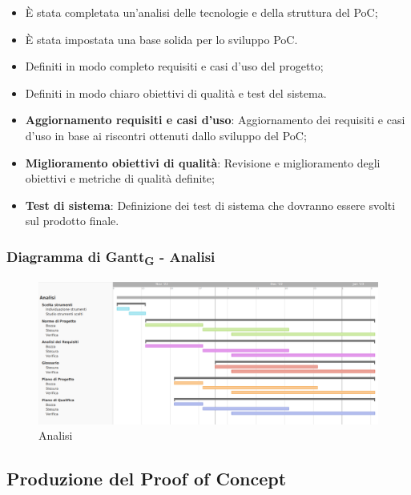 \:
\begin{itemize}
	\item È stata completata un'analisi delle tecnologie e della struttura del PoC;
	\item È stata impostata una base solida per lo sviluppo PoC.
\end{itemize}

\:
\begin{itemize}
	\item Definiti in modo completo requisiti e casi d'uso del progetto;
	\item Definiti in modo chiaro obiettivi di qualità e test del sistema.
\end{itemize}

\:
\begin{itemize}
	\item \textbf{Aggiornamento requisiti e casi d'uso}: Aggiornamento dei requisiti e casi d'uso in base ai riscontri ottenuti dallo sviluppo del PoC;
	\item \textbf{Miglioramento obiettivi di qualità}: Revisione e miglioramento degli obiettivi e metriche di qualità definite;
	\item \textbf{Test di sistema}: Definizione dei test di sistema che dovranno essere svolti sul prodotto finale.
\end{itemize}

\subsubsection{Diagramma di Gantt\textsubscript{G} - Analisi}

\begin{figure}[H]
\centering
\includegraphics[width=\textwidth]{img/4_analisi.png}
\caption{Analisi}
\end{figure}

\subsection{Produzione del Proof of Concept}
